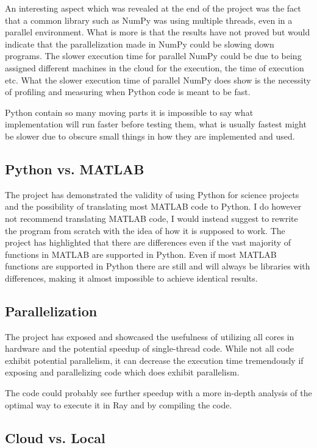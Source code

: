 \documentclass[12pt, a4paper]{article}
\begin{document}
An interesting aspect which was revealed at the end of the project was the fact that a common library such as NumPy was using multiple threads, even in a parallel environment.
What is more is that the results have not proved but would indicate that the parallelization made in NumPy could be slowing down programs.
The slower execution time for parallel NumPy could be due to being assigned different machines in the cloud for the execution, the time of execution etc.
What the slower execution time of parallel NumPy does show is the necessity of profiling and measuring when Python code is meant to be fast.

Python contain so many moving parts it is impossible to say what implementation will run faster before testing them, what is usually fastest might be slower due to obscure small things in how they are implemented and used.

\subsection{Python vs. MATLAB}

The project has demonstrated the validity of using Python for science projects and the possibility of translating most MATLAB code to Python.
I do however not recommend translating MATLAB code, I would instead suggest to rewrite the program from scratch with the idea of how it is supposed to work.
The project has highlighted that there are differences even if the vast majority of functions in MATLAB are supported in Python.
Even if most MATLAB functions are supported in Python there are still and will always be libraries with differences, making it almost impossible to achieve identical results.

\subsection{Parallelization}

The project has exposed and showcased the usefulness of utilizing all cores in hardware and the potential speedup of single-thread code.
While not all code exhibit potential parallelism, it can decrease the execution time tremendously if exposing and parallelizing code which does exhibit parallelism.

The code could probably see further speedup with a more in-depth analysis of the optimal way to execute it in Ray and by compiling the code.

\subsection{Cloud vs. Local}
\end{document}
